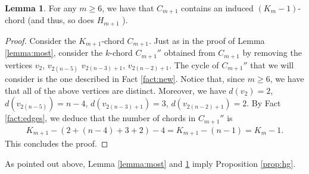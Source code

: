 \documentclass[12pt]{article}
\theoremstyle{definition}
\newtheorem{lemma}[thm]{Lemma}
\begin{document}
    \begin{lemma} \label{lemma:remainder}
        For any $m \geq 6$, we have that $C_{m+1}$ contains
        an induced $\left(K_{m} - 1\right)$-chord
        (and thus, so does $H_{m+1}$ ).
    \end{lemma}
    \begin{proof}
        Consider the $K_{m+1}$-chord $C_{m+1}$.
        Just as in the proof of Lemma \ref{lemma:most},
        consider the $k$-chord $C_{m+1}''$ obtained
        from $C_{m+1}$ by removing the vertices
        $v_2$, $v_{2\left(n-5\right)}$
        $v_{2\left(n-3\right)+1}$, $v_{2\left(n-2\right)+1}$.
        The cycle of $C_{m+1}''$ that
        we will consider is the one
        described in Fact \ref{fact:new}.
        Notice that, since $m \geq 6$, we have
        that all of the above vertices
        are distinct. Moreover, we have
        $d\left(v_2\right) = 2$, 
        $d\left(v_{2\left(n-5\right)}\right) = n-4$,
        $d\left(v_{2\left(n-3\right)+1}\right)=3$,
        $d\left(v_{2\left(n-2\right)+1}\right) = 2$.
        By Fact \ref{fact:edges}, 
        we deduce that the number of chords
        in $C_{m+1}''$ is
        \begin{gather*}
            K_{m+1} - \left(2 + \left(n-4\right)
            + 3 + 2\right) - 4 =
            K_{m+1} - \left(n-1\right) = K_{m} -1.
        \end{gather*}
        This concludes the proof.
    \end{proof}

    As pointed out above, Lemma
    \ref{lemma:most} and \ref{lemma:remainder}
    imply Proposition \ref{prop:hg}.
\end{document}
